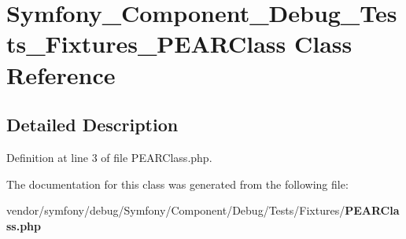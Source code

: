 \section{Symfony\+\_\+\+Component\+\_\+\+Debug\+\_\+\+Tests\+\_\+\+Fixtures\+\_\+\+P\+E\+A\+R\+Class Class Reference}
\label{class_symfony___component___debug___tests___fixtures___p_e_a_r_class}


\subsection{Detailed Description}


Definition at line 3 of file P\+E\+A\+R\+Class.\+php.



The documentation for this class was generated from the following file\+:\begin{DoxyCompactItemize}
\item 
vendor/symfony/debug/\+Symfony/\+Component/\+Debug/\+Tests/\+Fixtures/{\bf P\+E\+A\+R\+Class.\+php}\end{DoxyCompactItemize}
